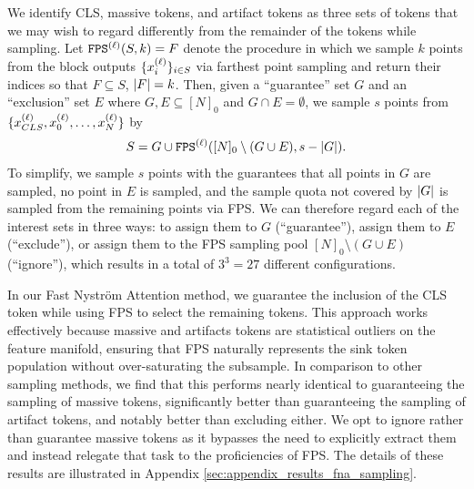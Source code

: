 \documentclass[10pt,twocolumn,letterpaper]{article}
\begin{document}
We identify CLS, massive tokens, and artifact tokens as three sets of tokens that we may wish to regard differently from the remainder of the tokens while sampling. Let $\texttt{FPS}^{(\ell)}(S, k) = F$ denote the procedure in which we sample $k$ points from the block outputs $\{x^{(\ell)}_{i}\}_{i \in S}$ via farthest point sampling and return their indices so that $F \subseteq S$, $\left\lvert F \right\rvert = k$. Then, given a ``guarantee'' set $G$ and an ``exclusion'' set $E$ where $G, E \subseteq [N]_0$ and $G \cap E = \emptyset$, we sample $s$ points from $\{x^{(\ell)}_{CLS}, x^{(\ell)}_{0}, \ldots, x^{(\ell)}_{N}\}$ by \begin{align}
    S = G \cup \texttt{FPS}^{(\ell)}([N]_0 \setminus (G \cup E), s - \left\lvert G \right\rvert).
\end{align} 
To simplify, we sample $s$ points with the guarantees that all points in $G$ are sampled, no point in $E$ is sampled, and the sample quota not covered by $\left\lvert G \right\rvert$ is sampled from the remaining points via FPS. We can therefore regard each of the interest sets in three ways: to assign them to $G$ (``guarantee''), assign them to $E$ (``exclude''), or assign them to the FPS sampling pool $[N]_0 \setminus (G \cup E)$ (``ignore''), which results in a total of $3^3 = 27$ different configurations.



In our Fast Nystr\"om Attention method, we guarantee the inclusion of the CLS token while using FPS to select the remaining tokens. This approach works effectively because massive and artifacts tokens are statistical outliers on the feature manifold, ensuring that FPS naturally represents the sink token population without over-saturating the subsample. In comparison to other sampling methods, we find that this performs nearly identical to guaranteeing the sampling of massive tokens, significantly better than guaranteeing the sampling of artifact tokens, and notably better than excluding either. We opt to ignore rather than guarantee massive tokens as it bypasses the need to explicitly extract them and instead relegate that task to the proficiencies of FPS. The details of these results are illustrated in Appendix \ref{sec:appendix_results_fna_sampling}.
\end{document}
